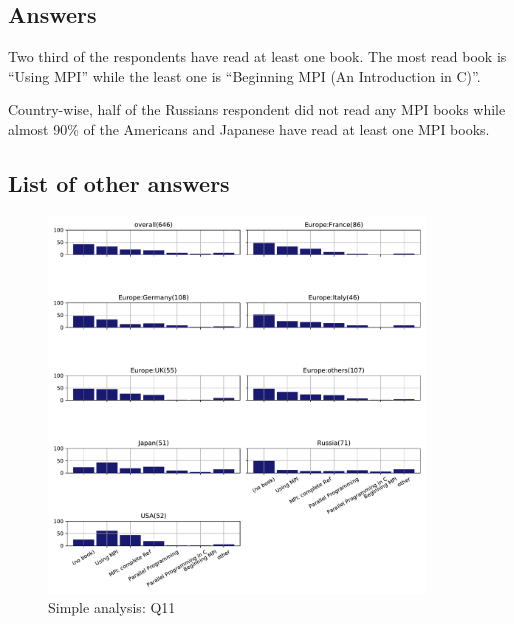 
\subsection{Answers}


Two third of the respondents have read at least one book. The most read book is
``Using MPI'' while the least one is ``Beginning MPI (An Introduction in C)''.

Country-wise, half of the Russians respondent did not read any MPI books while
almost 90\% of the Americans and Japanese have read at least one MPI books.
\subsection{List of other answers}
\begin{itemize}

\end{itemize}

\begin{figure}[htb]
\begin{center}
\includegraphics[width=10cm]{../pdfs/Q11.pdf}
\caption{Simple analysis: Q11}
\label{fig:Q11}
\end{center}
\end{figure}


